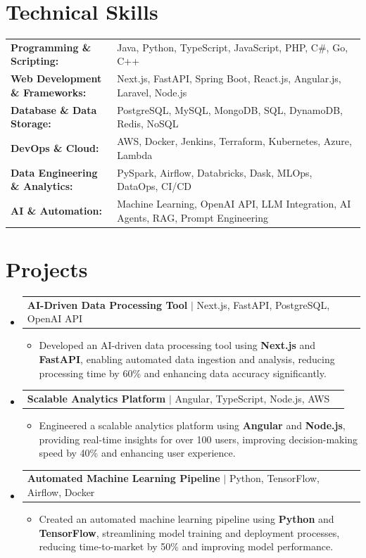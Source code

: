 \documentclass[letterpaper,10pt]{article}
\makeatletter
\newcommand{\resumeItem}[1]{
  \item{\fontsize{8pt}{9pt}\selectfont
    #1 \vspace{-3pt}
  }
}
\newcommand{\resumeProjectHeading}[2]{
    \item
    \begin{tabular*}{1.001\textwidth}{l@{\extracolsep{\fill}}r}
      \fontsize{8.5pt}{10pt}#1 & \textbf{\fontsize{8.5pt}{10pt} #2}\\
    \end{tabular*}\vspace{-7pt}
}
\newcommand{\resumeSubHeadingListStart}{\begin{itemize}[leftmargin=0pt, label={}]}
\newcommand{\resumeSubHeadingListEnd}{\end{itemize}}
\newcommand{\resumeItemListStart}{\begin{itemize}[leftmargin=*]}
\newcommand{\resumeItemListEnd}{\end{itemize}\vspace{-5pt}}
\makeatother
\begin{document}
\section{Technical Skills}
        \vspace{-14pt}
        \begin{table}[h]
            \fontsize{8pt}{9pt}\selectfont
            \begin{tabular}{p{0.3\linewidth} p{0.7\linewidth}}
                \textbf{Programming \& Scripting:} & Java, Python, TypeScript, JavaScript, PHP, C\#, Go, C++ \\
                \textbf{Web Development \& Frameworks:} & Next.js, FastAPI, Spring Boot, React.js, Angular.js, Laravel, Node.js \\
                \textbf{Database \& Data Storage:} & PostgreSQL, MySQL, MongoDB, SQL, DynamoDB, Redis, NoSQL \\
                \textbf{DevOps \& Cloud:} & AWS, Docker, Jenkins, Terraform, Kubernetes, Azure, Lambda \\
                \textbf{Data Engineering \& Analytics:} & PySpark, Airflow, Databricks, Dask, MLOps, DataOps, CI/CD \\
                \textbf{AI \& Automation:} & Machine Learning, OpenAI API, LLM Integration, AI Agents, RAG, Prompt Engineering \\
            \end{tabular}
        \end{table}
 \vspace{-18pt}

\section{Projects}
    \vspace{-5pt}
    \resumeSubHeadingListStart
          \resumeProjectHeading
            {\textbf{AI-Driven Data Processing Tool} $|$ Next.js, FastAPI, PostgreSQL, OpenAI API}{}
            \resumeItemListStart
                \resumeItem{Developed an AI-driven data processing tool using \textbf{Next.js} and \textbf{FastAPI}, enabling automated data ingestion and analysis, reducing processing time by 60\% and enhancing data accuracy significantly.}
            \resumeItemListEnd
        \vspace{-12pt}
    
        \resumeProjectHeading
            {\textbf{Scalable Analytics Platform} $|$ Angular, TypeScript, Node.js, AWS}{}
        \resumeItemListStart
                \resumeItem{Engineered a scalable analytics platform using \textbf{Angular} and \textbf{Node.js}, providing real-time insights for over 100 users, improving decision-making speed by 40\% and enhancing user experience.}
        \resumeItemListEnd
      \vspace{-12pt}
      \resumeProjectHeading
        {\textbf{Automated Machine Learning Pipeline} $|$ Python, TensorFlow, Airflow, Docker}{}
    \resumeItemListStart
            \resumeItem{Created an automated machine learning pipeline using \textbf{Python} and \textbf{TensorFlow}, streamlining model training and deployment processes, reducing time-to-market by 50\% and improving model performance.}
    \resumeItemListEnd
    \resumeSubHeadingListEnd
\end{document}
